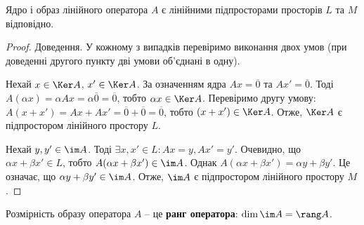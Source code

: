 \begin{claim}
	Ядро і образ лінійного оператора $A$ є лінійними підпросторами просторів
	$L$ та $M$ відповідно.
\end{claim}
\begin{proof}
	Доведення. У кожному з випадків перевіримо виконання двох умов (при
	доведенні другого пункту дві умови об’єднані в одну).

	Нехай $x \in \Ker A$, $x' \in \Ker A$. За означенням ядра $A x = \overline{0}$ та $A x' = \overline{0}$. Тоді
	$A(\alpha x) = \alpha A x = \alpha \overline{0} = \overline{0}$, тобто $\alpha x \in \Ker A$. Перевіримо другу умову:
	$A(x + x') = A x + A x' = \overline{0} + \overline{0} = \overline{0}$, тобто $(x + x') \in \Ker A$. Отже, $\Ker A$ є
	підпростором лінійного простору $L$.

	Нехай $y, y' \in \im A$. Тоді $\exists x, x' \in L: Ax = y, Ax' = y'$. Очевидно, що
	$\alpha x + \beta x' \in L$, тобто $A(\alpha x + \beta x') \in \im A$. Однак $A(\alpha x + \beta x') = \alpha y + \beta y'$. Це
	означає, що $\alpha y + \beta y' \in \im A$. Отже, $\im A$ є підпростором лінійного простору $M$. 
\end{proof}

\begin{definition}
	Розмірність образу оператора $A$ -- це \textbf{ранг оператора}:
	$\dim \im A = \rang A$.
\end{definition}


